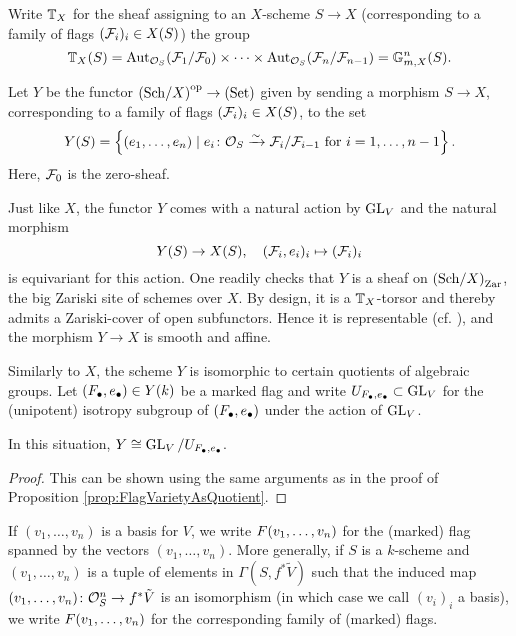 \documentclass[../main.tex]{subfiles}
\begin{document}
Write $\mathbb{T}_X$ for the sheaf assigning to an $X$-scheme $S \to X$ (corresponding
to a  family of flags $(\mathcal{F}_i)_i \in X(S)$) the group 
$$\mathbb{T}_X(S) = \operatorname{Aut}_{\mathcal{O}_S}(\mathcal{F}_1/\mathcal{F}_0) \times \dots \times \operatorname{Aut}_{\mathcal{O}_S}(\mathcal{F}_n/\mathcal{F}_{n-1}) 
= \mathbb{G}_{m,X}^n(S).$$

\begin{defi}\label{def:MarkedFlagVar}
  Let $Y$ be the functor ${(\mathrm{Sch}/{X})}^{\mathrm{op}} \to {(\mathrm{Set})}$ given by sending a morphism
  $S \to X$, corresponding to a family of flags $(\mathcal{F}_i)_i \in X(S)$, to the set
  \begin{equation*}
    Y(S) = \left\{(e_1, \dots, e_n) \mid e_i\colon  \mathcal{O}_S \xrightarrow{\sim} 
    \mathcal{F}_i/\mathcal{F}_{i-1}\text{ for } i = 1, \dots, n-1\right \}.
  \end{equation*}
  Here, $\mathcal{F}_0$ is the zero-sheaf.
\end{defi}
Just like $X$, the functor $Y$ comes with a natural action by $\operatorname{GL}_V$
and the natural morphism
\begin{equation}\label{eq:naturalmapYtoX}
  Y(S) \to X(S), \quad (\mathcal{F}_i, e_i)_i \mapsto (\mathcal{F}_i)_i
\end{equation}
is equivariant for this action. One readily checks that $Y$ is a sheaf on
${(\mathrm{Sch}/{X})}_{\mathrm{Zar}}$, the big Zariski site of schemes over $X$. 
By design, it is a $\mathbb{T}_X$-torsor and thereby admits a Zariski-cover of open
subfunctors. Hence it is representable (cf. \cite[Theorem
8.9]{gortz2020algebraic}), and the morphism $Y \to X$ is smooth and affine.

Similarly to $X$, the scheme $Y$ is isomorphic to certain quotients of
algebraic groups.
Let $(F_\bullet,e_\bullet) \in Y(k)$ be a marked flag and write 
$U_{F_\bullet, e_\bullet} \subset \operatorname{GL}_V$ for the (unipotent) isotropy subgroup of
$(F_\bullet, e_\bullet)$ under the action of $\operatorname{GL}_V$. 
\begin{lem}\label{lem:MarkedFlagVarietyAsQuotient}
  In this situation, $Y \cong \operatorname{GL}_V/U_{F_\bullet, e_\bullet}$.
\begin{proof}
  This can be shown using the same arguments as in the proof of
  Proposition \ref{prop:FlagVarietyAsQuotient}.
\end{proof}
\end{lem}

If $(v_1, \dots, v_n)$ is a basis for $V$, we write $F(v_1, \dots, v_n)$ for
the (marked) flag spanned by the vectors $(v_1, \dots, v_n)$. 
More generally, if $S$ is a $k$-scheme and $(v_1, \dots, v_n)$ is a tuple of
elements in $\Gamma(S, f^*\tilde V)$ such that the induced map $(v_1, \dots,
v_n)\colon  \mathcal{O}_S^n \to f^* \tilde V$ is an isomorphism (in which case we call
$(v_i)_i$ a basis), we write $F(v_1, \dots, v_n)$ for the corresponding
family of (marked) flags.
\end{document}

